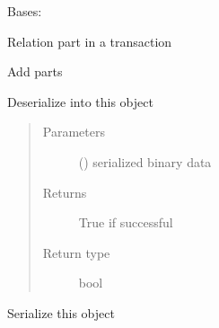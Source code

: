 \documentclass[letterpaper,10pt,english]{sphinxmanual}
\begin{document}

\begin{fulllineitems}
\label{\detokenize{bbc1.core.bbclib:bbc1.core.bbclib.BBcRelation}}
Bases: 

Relation part in a transaction

\begin{fulllineitems}
\label{\detokenize{bbc1.core.bbclib:bbc1.core.bbclib.BBcRelation.add}}
Add parts

\end{fulllineitems}


\begin{fulllineitems}
\label{\detokenize{bbc1.core.bbclib:bbc1.core.bbclib.BBcRelation.deserialize}}
Deserialize into this object
\begin{quote}\begin{description}
\item[{Parameters}] \leavevmode
{} () \textendash{} serialized binary data

\item[{Returns}] \leavevmode
True if successful

\item[{Return type}] \leavevmode
bool

\end{description}\end{quote}

\end{fulllineitems}


\begin{fulllineitems}
\label{\detokenize{bbc1.core.bbclib:bbc1.core.bbclib.BBcRelation.serialize}}
Serialize this object

\end{fulllineitems}


\end{fulllineitems}
\end{document}
